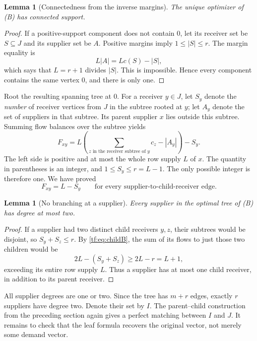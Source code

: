 \documentclass[11pt]{article}
\numberwithin{equation}{section}
\newtheorem{lemma}[theorem]{Lemma}
\theoremstyle{definition}
\begin{document}
\begin{lemma}[Connectedness from the inverse margins]
\label{tf:lem:Bconnected}
The unique optimizer of (B) has connected support.
\end{lemma}
\begin{proof}
If a positive-support component does not contain $0$, let its receiver
set be $S\subseteq J$ and its supplier set be $A$. Positive margins imply
$1\le |S|\le r$. The margin equality is
\[
 L|A|=L c(S)-|S|,
\]
which says that $L=r+1$ divides $|S|$. This is impossible. Hence every
component contains the same vertex $0$, and there is only one.
\end{proof}

Root the resulting spanning tree at $0$. For a receiver $y\in J$, let
$S_y$ denote the \emph{number} of receiver vertices from $J$ in the
subtree rooted at $y$; let $A_y$ denote the set of suppliers in that
subtree. Its parent supplier $x$ lies outside this subtree. Summing flow
balances over the subtree yields
\begin{equation}
 F_{xy}=L\left(\sum_{z\text{ in the receiver subtree of }y}c_z-|A_y|\right)-S_y.
 \label{tf:eq:cutB}
\end{equation}
The left side is positive and at most the whole row supply $L$ of $x$.
The quantity in parentheses is an integer, and $1\le S_y\le r=L-1$.
The only possible integer is therefore one. We have proved
\begin{equation}
 F_{xy}=L-S_y\qquad\text{for every supplier-to-child-receiver edge.}
 \label{tf:eq:childB}
\end{equation}

\begin{lemma}[No branching at a supplier]
\label{tf:lem:degreeB}
Every supplier in the optimal tree of (B) has degree at most two.
\end{lemma}
\begin{proof}
If a supplier had two distinct child receivers $y,z$, their subtrees
would be disjoint, so $S_y+S_z\le r$. By \eqref{tf:eq:childB}, the sum of
its flows to just those two children would be
\[
 2L-(S_y+S_z)\ge 2L-r=L+1,
\]
exceeding its entire row supply $L$. Thus a supplier has at most one child
receiver, in addition to its parent receiver.
\end{proof}

All supplier degrees are one or two. Since the tree has $m+r$ edges,
exactly $r$ suppliers have degree two. Denote their set by $I$. The
parent--child construction from the preceding section again gives a
perfect matching between $I$ and $J$. It remains to check that the leaf
formula recovers the original vector, not merely some demand vector.
\end{document}
